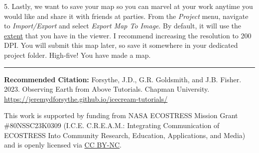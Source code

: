 \documentclass[oneside,a4paper,11pt,explicit]{book}
\begin{document}
\clearpage

5. Lastly, we want to save your map so you can marvel at your work anytime you would like and share it with friends at parties. From the \textit{Project} menu, navigate to \textit{Import/Export} and select \textit{Export Map To Image}. By default, it will use the \href{https://en.wikipedia.org/wiki/Map_extent}{extent} that you have in the viewer. I recommend increasing the resolution to 200 DPI. You will submit this map later, so save it somewhere in your dedicated project folder. High-five! You have made a map. 


\vfill

\hrule

\vspace{1em}

\small \textbf{Recommended Citation:} Forsythe, J.D., G.R. Goldsmith, and J.B. Fisher. 2023. Observing Earth from Above Tutorials. Chapman University. \url{https://jeremydforsythe.github.io/icecream-tutorials/}

\vspace{1em}

This work is supported by funding from NASA ECOSTRESS Mission Grant \#80NSSC23K0309 (I.C.E. C.R.E.A.M.: Integrating Communication of ECOSTRESS Into Community Research, Education, Applications, and Media) and is openly licensed via \href{https://creativecommons.org/licenses/by-nc/4.0/}{CC BY-NC}.
\end{document}

